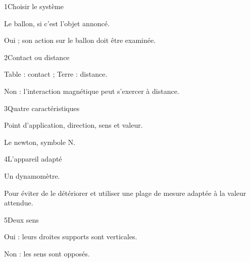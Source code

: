 \par\noindent\begin{minipage}{\linewidth}
\begin{corrige}{1}{Choisir le système}
\begin{questions}
\item Le ballon, si c’est l’objet annoncé.
\item Oui ; son action sur le ballon doit être examinée.
\end{questions}
\end{corrige}
\end{minipage}
\par\noindent\begin{minipage}{\linewidth}
\begin{corrige}{2}{Contact ou distance}
\begin{questions}
\item Table : contact ; Terre : distance.
\item Non : l’interaction magnétique peut s’exercer à distance.
\end{questions}
\end{corrige}
\end{minipage}
\par\noindent\begin{minipage}{\linewidth}
\begin{corrige}{3}{Quatre caractéristiques}
\begin{questions}
\item Point d’application, direction, sens et valeur.
\item Le newton, symbole N.
\end{questions}
\end{corrige}
\end{minipage}
\par\noindent\begin{minipage}{\linewidth}
\begin{corrige}{4}{L’appareil adapté}
\begin{questions}
\item Un dynamomètre.
\item Pour éviter de le détériorer et utiliser une plage de mesure adaptée à la valeur attendue.
\end{questions}
\end{corrige}
\end{minipage}
\par\noindent\begin{minipage}{\linewidth}
\begin{corrige}{5}{Deux sens}
\begin{questions}
\item Oui : leurs droites supports sont verticales.
\item Non : les sens sont opposés.
\end{questions}
\end{corrige}
\end{minipage}
